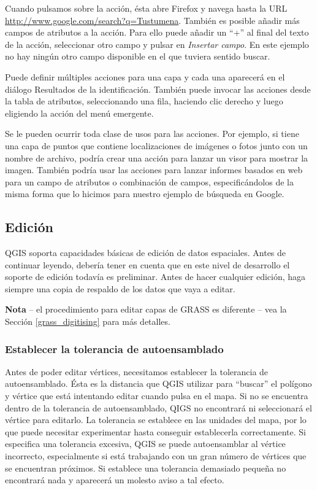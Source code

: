 Cuando pulsamos sobre la acción, ésta abre Firefox y navega hasta la URL
\url{http://www.google.com/search?q=Tustumena}. También es posible añadir más campos de atributos a la acción. Para ello puede añadir un ``+'' al final del texto de la acción, seleccionar otro campo y pulsar en \textsl{Insertar campo}. En este ejemplo no hay ningún otro campo disponible en el que tuviera sentido buscar.

Puede definir múltiples acciones para una capa y cada una aparecerá en el diálogo Resultados de la identificación. También puede invocar las acciones desde la tabla de atributos, seleccionando una fila, haciendo clic derecho y luego eligiendo la acción del menú emergente.

Se le pueden ocurrir toda clase de usos para las acciones. Por ejemplo, si tiene una capa de puntos que contiene localizaciones de imágenes o fotos junto con un nombre de archivo, podría crear una acción para lanzar un visor para mostrar la imagen. También podría usar las acciones para lanzar informes basados en web para un campo de atributos o combinación de campos, especificándolos de la misma forma que lo hicimos para nuestro ejemplo de búsqueda en Google.

\subsection{Edición}

QGIS soporta capacidades básicas de edición de datos espaciales. Antes de continuar leyendo, debería tener en cuenta que en este nivel de desarrollo el soporte de edición todavía es preliminar. Antes de hacer cualquier edición, haga siempre una copia de respaldo de los datos que vaya a editar.

\textbf{Nota} – el procedimiento para editar capas de GRASS es diferente – vea la Sección \ref{grass_digitising} para más detalles.

\subsubsection{Establecer la tolerancia de autoensamblado}

Antes de poder editar vértices, necesitamos establecer la tolerancia de autoensamblado. Ésta es la distancia que QGIS utilizar para ``buscar'' el polígono y vértice que está intentando editar cuando pulsa en el mapa. Si no se encuentra dentro de la tolerancia de autoensamblado, QIGS no encontrará ni seleccionará el vértice para editarlo. La tolerancia se establece en las unidades del mapa, por lo que puede necesitar experimentar hasta conseguir establecerla correctamente. Si especifica una tolerancia excesiva, QGIS se puede autoensamblar al vértice incorrecto, especialmente si está trabajando con un gran número de vértices que se encuentran próximos. Si establece una tolerancia demasiado pequeña no encontrará nada y aparecerá un molesto aviso a tal efecto.

